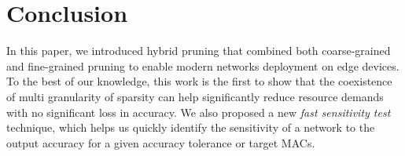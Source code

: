 \documentclass{article}
\begin{document}
\section{Conclusion}
In this paper, we introduced hybrid pruning that combined both coarse-grained and fine-grained pruning to enable modern networks deployment on edge devices. To the best of our knowledge, this work is the first to show that the coexistence of multi granularity of sparsity can help significantly reduce resource demands with no significant loss in accuracy. 
We also proposed a new \textit{fast sensitivity test} technique, which helps us quickly identify the sensitivity of a network to the output accuracy for a given accuracy tolerance or target MACs.  





%
\end{document}
